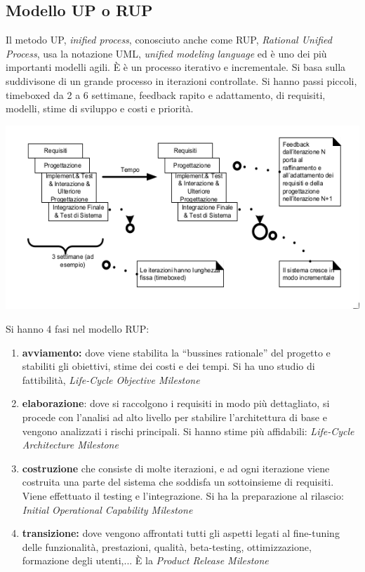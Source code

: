 \documentclass[a4paper,12pt, oneside]{book}
\begin{document}
\subsection{Modello UP o RUP}
Il metodo UP, \textit{inified process}, conosciuto anche come RUP, \textit{Rational Unified Process}, usa la notazione UML, \textit{unified modeling language} ed è uno dei più importanti modelli agili. È è un processo iterativo e incrementale. Si basa sulla suddivisone di un grande processo in iterazioni controllate. Si hanno passi piccoli, timeboxed da 2 a 6 settimane, feedback rapito e adattamento, di requisiti, modelli, stime di sviluppo e costi e priorità.
\begin{center}
	\includegraphics[scale=0.7]{img/ms4.png}
\end{center}
Si hanno 4 fasi nel modello RUP:
\begin{enumerate}
	\item \textbf{avviamento:} dove viene stabilita la “bussines rationale” del progetto e stabiliti gli obiettivi, stime dei costi e dei tempi. Si ha uno studio di fattibilità, \textit{Life-Cycle Objective Milestone}
	\item \textbf{elaborazione}: dove si raccolgono i requisiti in modo più dettagliato, si procede con l'analisi ad alto livello per stabilire l'architettura di base e vengono analizzati i rischi principali. Si hanno stime più affidabili: \textit{Life-Cycle Architecture Milestone}
	\item \textbf{costruzione} che consiste di molte iterazioni, e ad ogni iterazione viene costruita una parte del sistema che soddisfa un sottoinsieme di requisiti. Viene effettuato il testing e l'integrazione. Si ha la preparazione al rilascio: \textit{Initial Operational Capability Milestone}
	\item \textbf{transizione:} dove vengono affrontati tutti gli aspetti legati al fine-tuning delle funzionalità,
	      prestazioni, qualità, beta-testing, ottimizzazione, formazione degli
	      utenti,... È la \textit{Product Release Milestone}
\end{enumerate}
\end{document}
